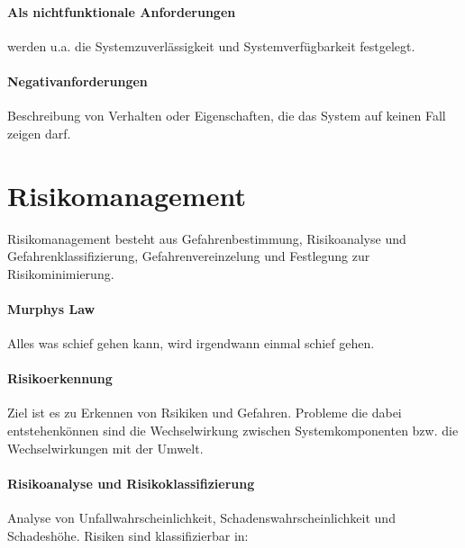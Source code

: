 \paragraph{Als nichtfunktionale Anforderungen} werden u.a. die Systemzuverlässigkeit und Systemverfügbarkeit festgelegt. 

\paragraph{Negativanforderungen} Beschreibung von Verhalten oder Eigenschaften, die das System auf keinen Fall zeigen darf.

\section{Risikomanagement}
Risikomanagement besteht aus Gefahrenbestimmung, Risikoanalyse und Gefahrenklassifizierung, Gefahrenvereinzelung und Festlegung zur Risikominimierung.

\paragraph{Murphys Law} Alles was schief gehen kann, wird irgendwann einmal schief gehen.

\paragraph{Risikoerkennung} Ziel ist es zu Erkennen von Rsikiken und Gefahren. Probleme die dabei entstehenkönnen sind die Wechselwirkung zwischen Systemkomponenten bzw. die Wechselwirkungen mit der Umwelt. 

\paragraph{Risikoanalyse und Risikoklassifizierung} Analyse von  Unfallwahrscheinlichkeit, Schadenswahrscheinlichkeit und Schadeshöhe. Risiken sind klassifizierbar in:

